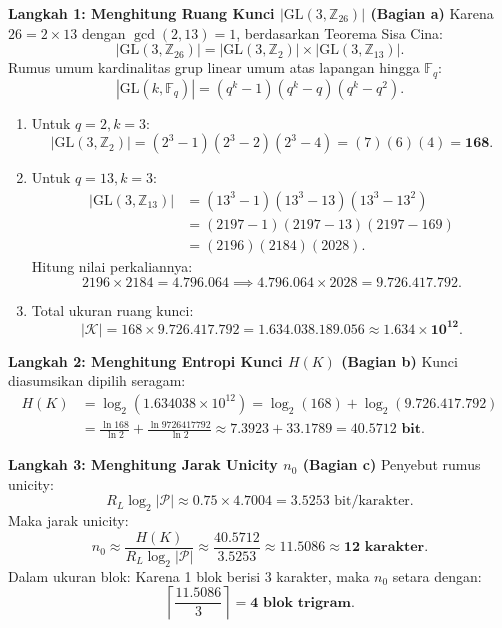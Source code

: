 \documentclass[11pt,a4paper]{article}
\begin{document}
\noindent\textbf{Langkah 1: Menghitung Ruang Kunci $|\mathrm{GL}(3, \mathbb{Z}_{26})|$ (Bagian a)}
Karena $26 = 2 \times 13$ dengan $\gcd(2, 13) = 1$, berdasarkan Teorema Sisa Cina:
\[
|\mathrm{GL}(3, \mathbb{Z}_{26})| = |\mathrm{GL}(3, \mathbb{Z}_2)| \times |\mathrm{GL}(3, \mathbb{Z}_{13})|.
\]
Rumus umum kardinalitas grup linear umum atas lapangan hingga $\mathbb{F}_q$:
\begin{equation}
|\mathrm{GL}(k, \mathbb{F}_q)| = (q^k - 1)(q^k - q)(q^k - q^2).
\end{equation}
\begin{enumerate}
    \item Untuk $q = 2, k = 3$:
    \[
    |\mathrm{GL}(3, \mathbb{Z}_2)| = (2^3 - 1)(2^3 - 2)(2^3 - 4) = (7)(6)(4) = \mathbf{168}.
    \]
    \item Untuk $q = 13, k = 3$:
    \begin{align*}
    |\mathrm{GL}(3, \mathbb{Z}_{13})| &= (13^3 - 1)(13^3 - 13)(13^3 - 13^2) \\
    &= (2197 - 1)(2197 - 13)(2197 - 169) \\
    &= (2196)(2184)(2028).
    \end{align*}
    Hitung nilai perkaliannya:
    \[
    2196 \times 2184 = 4.796.064 \implies 4.796.064 \times 2028 = \mathbf{9.726.417.792}.
    \]
    \item Total ukuran ruang kunci:
    \[
    |\mathcal{K}| = 168 \times 9.726.417.792 = \mathbf{1.634.038.189.056} \approx \mathbf{1.634 \times 10^{12}}.
    \]
\end{enumerate}

\noindent\textbf{Langkah 2: Menghitung Entropi Kunci $H(K)$ (Bagian b)}
Kunci diasumsikan dipilih seragam:
\begin{align*}
H(K) &= \log_2(1.634038 \times 10^{12}) = \log_2(168) + \log_2(9.726.417.792) \\
&= \frac{\ln 168}{\ln 2} + \frac{\ln 9726417792}{\ln 2} \approx 7.3923 + 33.1789 = \mathbf{40.5712\text{ bit}}.
\end{align*}

\noindent\textbf{Langkah 3: Menghitung Jarak Unicity $n_0$ (Bagian c)}
Penyebut rumus unicity:
\[
R_L \log_2 |\mathcal{P}| \approx 0.75 \times 4.7004 = 3.5253\text{ bit/karakter}.
\]
Maka jarak unicity:
\[
n_0 \approx \frac{H(K)}{R_L \log_2 |\mathcal{P}|} \approx \frac{40.5712}{3.5253} \approx 11.5086 \approx \mathbf{12\text{ karakter}}.
\]
Dalam ukuran blok: Karena 1 blok berisi 3 karakter, maka $n_0$ setara dengan:
\[
\left\lceil \frac{11.5086}{3} \right\rceil = \mathbf{4\text{ blok trigram}}.
\]
\end{document}

